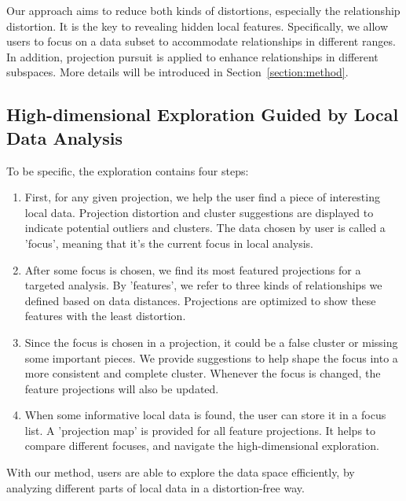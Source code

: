 Our approach aims to reduce both kinds of distortions, especially the relationship distortion. It is the key to revealing hidden local features. Specifically, we allow users to focus on a data subset to accommodate relationships in different ranges. In addition, projection pursuit is applied to enhance relationships in different subspaces. More details will be introduced in Section~\ref{section:method}.

\subsection{High-dimensional Exploration Guided by Local Data Analysis}

To be specific, the exploration contains four steps:
\begin{enumerate}[(1)]
 \item First, for any given projection, we help the user find a piece of interesting local data. Projection distortion and cluster suggestions are displayed to indicate potential outliers and clusters. The data chosen by user is called a 'focus', meaning that it's the current focus in local analysis.
 \item After some focus is chosen, we find its most featured projections for a targeted analysis. By 'features', we refer to three kinds of relationships we defined based on data distances. Projections are optimized to show these features with the least distortion.
 \item Since the focus is chosen in a projection, it could be a false cluster or missing some important pieces. We provide suggestions to help shape the focus into a more consistent and complete cluster. Whenever the focus is changed, the feature projections will also be updated.
 \item When some informative local data is found, the user can store it in a focus list. A 'projection map' is provided for all feature projections. It helps to compare different focuses, and navigate the high-dimensional exploration.
\end{enumerate}
 With our method, users are able to explore the data space efficiently, by analyzing different parts of local data in a distortion-free way.


